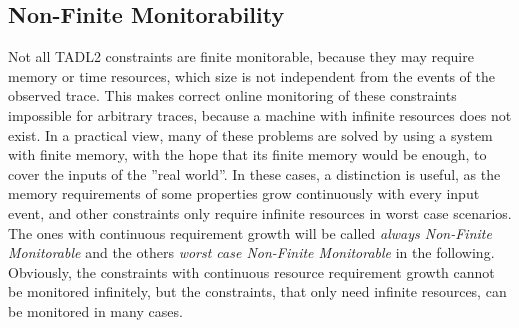 			
	\subsection{Non-Finite Monitorability}
		Not all TADL2 constraints are finite monitorable, because they may require memory or time resources, which size is not independent from the events of the observed trace. This makes correct online monitoring of these constraints impossible for arbitrary traces, because a machine with infinite resources does not exist. In a practical view, many of these problems are solved by using a system with finite memory, with the hope that its finite memory would be enough, to cover the inputs of the ''real world''. In these cases, a distinction is useful, as the memory requirements of some properties grow continuously with every input event, and other constraints only require infinite resources in worst case scenarios. The ones with continuous requirement growth will be called \emph{always Non-Finite Monitorable} and the others \emph{worst case Non-Finite Monitorable} in the following.\\
		Obviously, the constraints with continuous resource requirement growth cannot be monitored infinitely, but the constraints, that only need infinite resources, can be monitored in many cases.

	 
